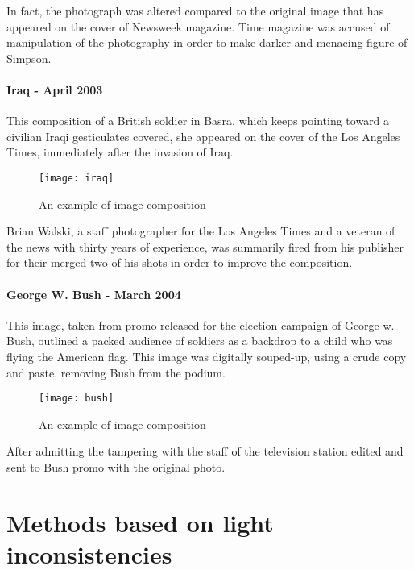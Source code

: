 In fact, the photograph was altered compared to the original image that has appeared on the cover of Newsweek magazine. Time magazine was accused of manipulation of the photography in order to make darker and menacing figure of Simpson.

\paragraph{Iraq - April 2003}

This composition of a British soldier in Basra, which keeps pointing toward a civilian Iraqi gesticulates covered, she appeared on the cover of the Los Angeles Times, immediately after the invasion of Iraq. 

\begin{wrapfigure}{l}{0.5\textwidth}
  \begin{center}
    \texttt{[image: iraq]}
  \end{center}
  \caption{An example of image composition}
\end{wrapfigure}

Brian Walski, a staff photographer for the Los Angeles Times and a veteran of the news with thirty years of experience, was summarily fired from his publisher for their merged two of his shots in order to improve the composition.

\paragraph{George W. Bush - March 2004}

This image, taken from promo released for the election campaign of George w. Bush, outlined a packed audience of soldiers as a backdrop to a child who was flying the American flag. This image was digitally souped-up, using a crude copy and paste, removing Bush from the podium. 

\begin{wrapfigure}{r}{0.5\textwidth}
  \begin{center}
    \texttt{[image: bush]}
  \end{center}
  \caption{An example of image composition}
\end{wrapfigure}


After admitting the tampering with the staff of the television station edited and sent to Bush promo with the original photo.

\section{Methods based on light inconsistencies}
